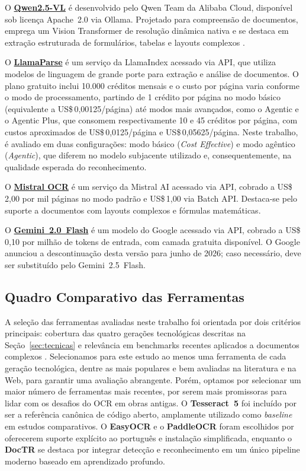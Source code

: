 \documentclass[
  12pt,
  oneside,
  a4paper,
  chapter=TITLE,
  section=TITLE,
  english,
  brazil
]{abntex2}
\begin{document}
O \href{https://github.com/QwenLM/Qwen2.5-VL}{\textbf{Qwen2.5-VL}} \cite{qwen2025vl}
é desenvolvido pelo Qwen Team da Alibaba Cloud, disponível sob licença Apache~2.0 via
Ollama. Projetado para compreensão de documentos, emprega um Vision Transformer de
resolução dinâmica nativa e se destaca em extração estruturada de formulários, tabelas e
layouts complexos \cite{vesalainen2025}.

O \href{https://www.llamaindex.ai/llamaparse}{\textbf{LlamaParse}}
\cite{llamaparse_pricing} é um serviço da LlamaIndex acessado via API, que utiliza
modelos de linguagem de grande porte para extração e análise de documentos. O plano
gratuito inclui 10.000 créditos mensais e o custo por página varia conforme o modo de
processamento, partindo de 1 crédito por página no modo básico (equivalente a
US\$\,0,00125/página) até modos mais avançados, como o Agentic e o Agentic Plus,
que consomem respectivamente 10 e 45 créditos por página, com custos aproximados de
US\$\,0,0125/página e US\$\,0,05625/página. Neste trabalho, é avaliado em duas
configurações: modo básico (\textit{Cost Effective}) e modo agêntico
(\textit{Agentic}), que diferem no modelo subjacente utilizado e, consequentemente,
na qualidade esperada do reconhecimento.

O \href{https://mistral.ai/news/mistral-ocr}{\textbf{Mistral OCR}} \cite{mistral2025}
é um serviço da Mistral AI acessado via API, cobrado a US\$\,2,00 por mil páginas no
modo padrão e US\$\,1,00 via Batch API. Destaca-se pelo suporte a documentos com layouts
complexos e fórmulas matemáticas.

O \href{https://ai.google.dev/gemini-api/docs/models}{\textbf{Gemini~2.0~Flash}}
\cite{gemini_pricing} é um modelo do Google acessado via API, cobrado a
US\$\,0,10 por milhão de tokens de entrada, com camada gratuita disponível. O Google
anunciou a descontinuação desta versão para junho de 2026; caso necessário, deve ser
substituído pelo Gemini~2.5~Flash.

\subsection{Quadro Comparativo das Ferramentas}

A seleção das ferramentas avaliadas neste trabalho foi orientada por dois critérios
principais: cobertura das quatro gerações tecnológicas descritas na
Seção~\ref{sec:tecnicas} e relevância em benchmarks recentes aplicados a documentos
complexos \cite{dataunboxed2025,vesalainen2025}. Selecionamos para este estudo ao menos
uma ferramenta de cada geração tecnológica, dentre as mais populares e bem avaliadas na
literatura e na Web, para garantir uma avaliação abrangente. Porém, optamos por
selecionar um maior número de ferramentas mais recentes, por serem mais promissoras
para lidar com os desafios do OCR em obras antigas. O \textbf{Tesseract~5} foi incluído por
ser a referência canônica de código aberto, amplamente utilizado como \textit{baseline}
em estudos comparativos. O \textbf{EasyOCR} e o \textbf{PaddleOCR} foram escolhidos por
oferecerem suporte explícito ao português e instalação simplificada, enquanto o
\textbf{DocTR} se destaca por integrar detecção e reconhecimento em um único pipeline
moderno baseado em aprendizado profundo.
\end{document}
